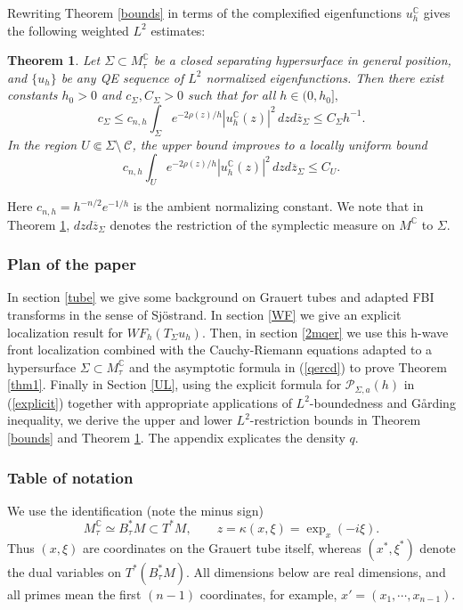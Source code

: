 \documentclass[11pt,reqno]{amsart}
\newcommand{\C}{{\mathbb C}}
\newtheorem{theorem}{Theorem}
\theoremstyle{definition}
\begin{document}
Rewriting Theorem \ref{bounds} in terms of the complexified eigenfunctions $u_h^{\C}$ gives the following weighted $L^2$ estimates:

\begin{theorem} \label{cor}
 Let $\Sigma \subset M_{\tau}^{\C}$ be a closed separating hypersurface in general position, and $\{ u_h \}$ be any QE sequence of $L^2$ normalized eigenfunctions. Then there exist constants $ h_0>0$ and $c_{\Sigma}, C_{\Sigma} >0$ such that for all $h \in (0,h_0],$
 $$ 
 c_{\Sigma} \leq c_{n,h}\int_{\Sigma} e^{-2 \rho(z)/h} | u_h^{\C}(z)|^2 \,  dz d\overline{z}_{\Sigma} \leq C_{\Sigma} h^{-1}.
 $$
 In the region $U\Subset \Sigma\setminus \ {\mathcal C}$, the upper bound improves to a locally uniform bound
 $$
 c_{n,h}\int_{U} e^{-2 \rho(z)/h} | u_h^{\C}(z)|^2 \, dz d\overline{z}_{\Sigma} \leq C_U.
 $$
\end{theorem}
 
Here $c_{n,h}=h^{-n/2}e^{-1/h}$ is the ambient normalizing constant. We note that in Theorem \ref{cor}, $dz d\overline{z}_{\Sigma}$ denotes the restriction of the symplectic measure on $M^{\C}$ to $\Sigma.$

\subsubsection{Plan of the paper}
In section \ref{tube} we give some background on Grauert tubes and adapted FBI transforms in the sense of Sj\"{o}strand. In section \ref{WF} we give an explicit localization result for $WF_h (T_{\Sigma}u_h).$ Then, in section \ref{2mqer} we use this h-wave front localization combined with the Cauchy-Riemann equations adapted to a hypersurface $\Sigma \subset M_{\tau}^{\C}$ and the asymptotic formula in (\ref{qercd}) to prove Theorem \ref{thm1}. Finally in Section \ref{UL}, using the explicit formula for ${\mathcal P}_{\Sigma,a}(h)$ in (\ref{explicit}) together with appropriate applications of $L^2$-boundedness and G\aa rding inequality, we derive the upper and lower $L^2$-restriction bounds in Theorem \ref{bounds} and Theorem \ref{cor}. The appendix explicates the density $q$.


\subsubsection{Table of notation}

We use the identification (note the minus sign)
\[
    M_\tau^{\mathbb C}\simeq B_\tau^*M\subset T^*M,
    \qquad
    z=\kappa(x,\xi)=\exp_x(-i\xi).
\]
Thus $(x,\xi)$ are coordinates on the Grauert tube itself, whereas
$(x^*,\xi^*)$ denote the dual variables on $T^*(B_\tau^*M)$.
All dimensions below are real dimensions, and all primes mean the first $(n-1)$ coordinates, for example, $x'=(x_1,\cdots, x_{n-1})$.
\end{document}
